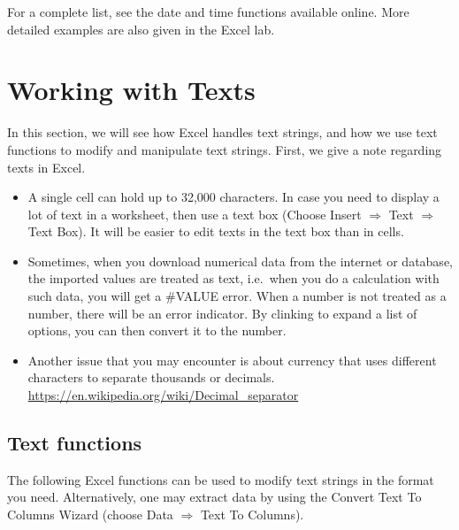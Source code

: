 \documentclass[
]{article}
\theoremstyle{definition}
\theoremstyle{definition}
\theoremstyle{definition}
\theoremstyle{definition}
\theoremstyle{remark}
\begin{document}
For a complete list, see the date and time functions available online.
More detailed examples are also given in the Excel lab.

\hypertarget{working-with-texts}{%
\section{Working with Texts}\label{working-with-texts}}

In this section, we will see how Excel handles text strings, and how we
use text functions to modify and manipulate text strings. First, we give
a note regarding texts in Excel.

\begin{itemize}
\item
  A single cell can hold up to 32,000 characters. In case you need to
  display a lot of text in a worksheet, then use a text box (Choose
  Insert \(\Rightarrow\) Text \(\Rightarrow\) Text Box). It will be easier
  to edit texts in the text box than in cells.
\item
  Sometimes, when you download numerical data from the internet or
  database, the imported values are treated as text, i.e.~when you do
  a calculation with such data, you will get a \#VALUE error. When a
  number is not treated as a number, there will be an error indicator.
  By clinking to expand a list of options, you can then convert it to
  the number.
\item
  Another issue that you may encounter is about currency that uses
  different characters to separate thousands or decimals.
  \url{https://en.wikipedia.org/wiki/Decimal_separator}
\end{itemize}

\hypertarget{text-functions}{%
\subsection{Text functions}\label{text-functions}}

The following Excel functions can be used to modify text strings in the
format you need. Alternatively, one may extract data by using the
Convert Text To Columns Wizard (choose Data \(\Rightarrow\) Text To
Columns).
\end{document}
